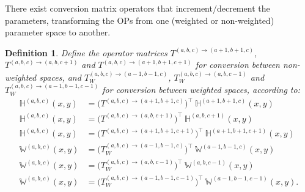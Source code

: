 \documentclass[11pt, oneside]{article}   	%
\newcommand{\pddx}{\frac{\partial}{\partial x}}
\newcommand{\pddy}{\frac{\partial}{\partial y}}
\newcommand{\hdop}{H}
\newcommand{\bighdop}{\mathbb{\hdop}}
\newcommand{\hdopnkab}{\hdop_{n,k}^{(a,b)}}
\newcommand{\hdopmj}{\hdop_{m,j}}
\newcommand{\bigW}{\mathbb{W}}
\newcommand{\hdopnkabc}{\hdop_{n,k}^{(a,b,c)}}
\newcommand{\Wabc}{{W^{(a,b,c)}}}
\newtheorem{definition}{Definition}
\begin{document}
%

There exist conversion matrix operators that increment/decrement the parameters, transforming the OPs from one (weighted or non-weighted) parameter space to another. 

\begin{definition}\label{def:parametertransformationoperators}
Define the operator matrices $T^{(a,b,c)\to(a+1,b+1,c)}$, $T^{(a,b,c)\to(a,b,c+1)}$ and $T^{(a,b,c)\to(a+1,b+1,c+1)}$ for conversion between non-weighted spaces, and $T_W^{(a,b,c)\to(a-1,b-1,c)}$, $T_W^{(a,b,c)\to(a,b,c-1)}$ and $T_W^{(a,b,c)\to(a-1,b-1,c-1)}$ for conversion between weighted spaces, according to:
\begin{align*}
	\bighdop^{(a,b,c)}(x,y) &= \Big(T^{(a,b,c)\to(a+1,b+1,c)} \Big)^\top \: \bighdop^{(a+1,b+1,c)}(x,y) \\
	\bighdop^{(a,b,c)}(x,y) &= \Big(T^{(a,b,c)\to(a,b,c+1)} \Big)^\top \: \bighdop^{(a,b,c+1)}(x,y) \\
	\bighdop^{(a,b,c)}(x,y) &= \Big(T^{(a,b,c)\to(a+1,b+1,c+1)} \Big)^\top \: \bighdop^{(a+1,b+1,c+1)}(x,y) \\
	\bigW^{(a,b,c)}(x,y) &= \Big(T_W^{(a,b,c)\to(a-1,b-1,c)} \Big)^\top \: \bigW^{(a-1,b-1,c)}(x,y) \\
	\bigW^{(a,b,c)}(x,y) &= \Big(T_W^{(a,b,c)\to(a,b,c-1)} \Big)^\top \: \bigW^{(a,b,c-1)}(x,y) \\
	\bigW^{(a,b,c)}(x,y) &= \Big(T_W^{(a,b,c)\to(a-1,b-1,c-1)} \Big)^\top \: \bigW^{(a-1,b-1,c-1)}(x,y).
\end{align*}
\end{definition}
\end{document}
